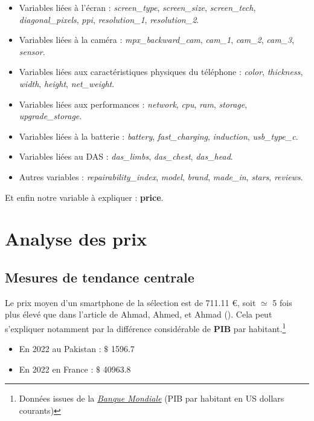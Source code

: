 \documentclass[
  12pt,
]{report}
\providecommand{\tightlist}{%
  \setlength{\itemsep}{0pt}\setlength{\parskip}{0pt}}\usepackage{longtable,booktabs,array}
\begin{document}
\begin{itemize}
\item
  Variables liées à l'écran : \emph{screen\_type}, \emph{screen\_size},
  \emph{screen\_tech}, \emph{diagonal\_pixels}, \emph{ppi},
  \emph{resolution\_1}, \emph{resolution\_2}.
\item
  Variables liées à la caméra : \emph{mpx\_backward\_cam},
  \emph{cam\_1}, \emph{cam\_2}, \emph{cam\_3}, \emph{sensor}.
\item
  Variables liées aux caractéristiques physiques du téléphone :
  \emph{color}, \emph{thickness}, \emph{width}, \emph{height},
  \emph{net\_weight}.
\item
  Variables liées aux performances : \emph{network}, \emph{cpu},
  \emph{ram}, \emph{storage}, \emph{upgrade\_storage}.
\item
  Variables liées à la batterie : \emph{battery}, \emph{fast\_charging},
  \emph{induction}, \emph{usb\_type\_c}.
\item
  Variables liées au DAS : \emph{das\_limbs}, \emph{das\_chest},
  \emph{das\_head}.
\item
  Autres variables : \emph{repairability\_index}, \emph{model},
  \emph{brand}, \emph{made\_in}, \emph{stars}, \emph{reviews}.
\end{itemize}

Et enfin notre variable à expliquer : \textbf{price}.

\section{Analyse des prix}\label{analyse-des-prix}

\subsection{Mesures de tendance
centrale}\label{mesures-de-tendance-centrale}

Le prix moyen d'un smartphone de la sélection est de 711.11 €, soit
\(\simeq\) 5 fois plus élevé que dans l'article de Ahmad, Ahmed, et
Ahmad (). Cela peut s'expliquer notamment
par la différence considérable de \textbf{PIB} par habitant.\footnote{Données
  issues de la
  \href{https://donnees.banquemondiale.org/indicator/NY.GDP.PCAP.CD?most_recent_year_desc=true}{\emph{Banque
  Mondiale}} (PIB par habitant en US dollars courants)}

\begin{itemize}
\tightlist
\item
  En 2022 au Pakistan : \(\$\) 1596.7
\item
  En 2022 en France : \(\$\) 40963.8
\end{itemize}
\end{document}
